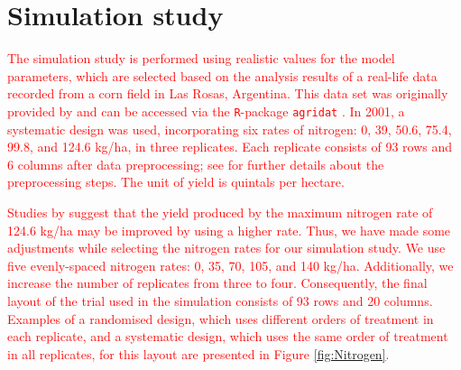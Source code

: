 \documentclass[a4paper]{article} 	%
\newcommand{\revision}[1]{\textcolor{red}{#1}}
\newcommand{\zc}[1]{\textcolor{red}{#1}}
\begin{document}



\section{Simulation study}\label{Sec:Simu}



\revision{The simulation study is performed using realistic values for the model parameters, which are selected based on the analysis results of a real-life data recorded from a corn field in Las Rosas, Argentina. This data set was originally provided by \textcite{Luc2004ASpatial} and can be accessed via the \texttt{R}-package \texttt{agridat} \parencite{White2008Agridat}. In 2001, a systematic design was used, incorporating six rates of nitrogen: 0, 39, 50.6, 75.4, 99.8, and 124.6 kg/ha, in three replicates. Each replicate consists of 93 rows and 6 columns after data preprocessing; see \textcite{Rakshit2020Novel} for further details about the preprocessing steps. The unit of yield is quintals per hectare.} 

\revision{Studies by \textcite{Rakshit2020Novel, Cao2022Bayesian} suggest that the yield produced by the maximum nitrogen rate of 124.6 kg/ha may be improved by using a higher rate. Thus, we have made some adjustments while selecting the nitrogen rates for our simulation study. We use five evenly-spaced nitrogen rates: 0, 35, 70, 105, and 140 kg/ha. Additionally, we increase the number of replicates from three to four. Consequently, the final layout of the trial used in the simulation consists of 93 rows and 20 columns. Examples of a randomised design, \zc{which uses different orders of treatment in each replicate}, and a systematic design, \zc{which uses the same order of treatment in all replicates}, for this layout are presented in Figure \ref{fig:Nitrogen}.} 
\end{document}
